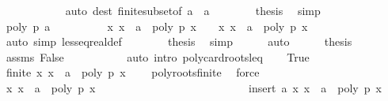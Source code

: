 \begin{isabellebody}
\ \ \ \ \ \ \ \ \ \ \isamarkupfalse%
\ {\isacharparenleft}auto\ dest{\isacharcolon}\ finite{\isacharunderscore}subset{\isacharbrackleft}of\ {\isachardoublequoteopen}{\isacharbraceleft}a\ {\isacharminus}\ {}{\isacharless}{\isachardot}{\isachardot}{\isacharless}a{\isacharbraceright}{\isachardoublequoteclose}{\isacharbrackright}{\isacharparenright}\isanewline
\ \ \ \ \ \ \isamarkupfalse%
\ {\isacharquery}thesis\ \isamarkupfalse%
\ simp\isanewline
\ \ \ \ \isamarkupfalse%
\isanewline
\ \ \ \ \ \ \isamarkupfalse%
\ {\isachardoublequoteopen}poly\ p\ a\ {\isasymnoteq}\ {}{\isachardoublequoteclose}\isanewline
\ \ \ \ \ \ \isamarkupfalse%
\ {\isachardoublequoteopen}{\isacharbraceleft}x{\isachardot}\ x\ {\isacharless}\ a\ {\isasymand}\ poly\ p\ x\ {\isacharequal}\ {}{\isacharbraceright}\ {\isacharequal}\ {\isacharbraceleft}x{\isachardot}\ x\ {\isasymle}\ a\ {\isasymand}\ poly\ p\ x\ {\isacharequal}\ {}{\isacharbraceright}{\isachardoublequoteclose}\ \isanewline
\ \ \ \ \ \ \ \ \ \ \isamarkupfalse%
\ {\isacharparenleft}auto\ simp{\isacharcolon}\ less{\isacharunderscore}eq{\isacharunderscore}real{\isacharunderscore}def{\isacharparenright}\isanewline
\ \ \ \ \ \ \isamarkupfalse%
\ {\isacharquery}thesis\ \isamarkupfalse%
\ simp\isanewline
\ \ \ \ \isamarkupfalse%
\ auto\isanewline
\ \ \ \ \isamarkupfalse%
\ {\isacharquery}thesis\ \isamarkupfalse%
\ assms\ False\ \isanewline
\ \ \ \ \ \ \ \ \isamarkupfalse%
\ {\isacharparenleft}auto\ intro{\isacharcolon}\ poly{\isacharunderscore}card{\isacharunderscore}roots{\isacharunderscore}leq{\isacharparenright}\isanewline
{}\isamarkupfalse%
\isanewline
\ \ \isamarkupfalse%
\ True\isanewline
\ \ \ \ \isamarkupfalse%
\ {\isachardoublequoteopen}finite\ {\isacharbraceleft}x{\isachardot}\ x\ {\isacharless}\ a\ {\isasymand}\ poly\ p\ x\ {\isacharequal}\ {}{\isacharbraceright}{\isachardoublequoteclose}\ \isamarkupfalse%
\ poly{\isacharunderscore}roots{\isacharunderscore}finite\ \isamarkupfalse%
\ force\isanewline
\ \ \ \ \isamarkupfalse%
\ \isamarkupfalse%
\ {\isachardoublequoteopen}{\isacharbraceleft}x{\isachardot}\ x\ {\isasymle}\ a\ {\isasymand}\ poly\ p\ x\ {\isacharequal}\ {}{\isacharbraceright}\ {\isacharequal}\ \isanewline
\ \ \ \ \ \ \ \ \ \ \ \ \ \ \ \ \ \ \ \ \ \ \ insert\ a\ {\isacharbraceleft}x{\isachardot}\ x\ {\isacharless}\ a\ {\isasymand}\ poly\ p\ x\ {\isacharequal}\ {}{\isacharbraceright}{\isachardoublequoteclose}\ \isamarkupfalse%

\end{isabellebody}
